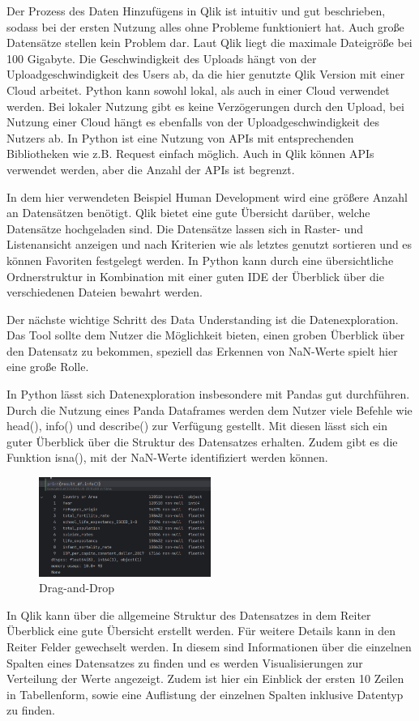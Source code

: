 \documentclass[12pt]{article}
\begin{document}
	Der Prozess des Daten Hinzufügens in Qlik ist intuitiv und gut beschrieben, sodass bei der ersten Nutzung alles ohne Probleme funktioniert hat. Auch große Datensätze stellen kein Problem dar. Laut Qlik liegt die maximale Dateigröße bei 100 Gigabyte. Die Geschwindigkeit des Uploads hängt von der Uploadgeschwindigkeit des Users ab, da die hier genutzte Qlik Version mit einer Cloud arbeitet. Python kann sowohl lokal, als auch in einer Cloud verwendet werden. Bei lokaler Nutzung gibt es keine Verzögerungen durch den Upload, bei Nutzung einer Cloud hängt es ebenfalls von der Uploadgeschwindigkeit des Nutzers ab.
	In Python ist eine Nutzung von APIs mit entsprechenden Bibliotheken wie z.B. Request einfach möglich.
	Auch in Qlik können APIs verwendet werden, aber die Anzahl der APIs ist begrenzt.
	
	In dem hier verwendeten Beispiel Human Development wird eine größere Anzahl an Datensätzen benötigt. Qlik bietet eine gute Übersicht darüber, welche Datensätze hochgeladen sind. Die Datensätze lassen sich in Raster- und Listenansicht anzeigen und nach Kriterien wie als letztes genutzt sortieren und es können Favoriten festgelegt werden. In Python kann durch eine übersichtliche Ordnerstruktur in Kombination mit einer guten IDE der Überblick über die verschiedenen Dateien bewahrt werden.
	
	Der nächste wichtige Schritt des Data Understanding ist die Datenexploration. Das Tool sollte dem Nutzer die Möglichkeit bieten, einen groben Überblick über den Datensatz zu bekommen, speziell das Erkennen von NaN-Werte spielt hier eine große Rolle.
	
	In Python lässt sich Datenexploration insbesondere mit Pandas gut durchführen. Durch die Nutzung eines Panda Dataframes werden dem Nutzer viele Befehle wie head(), info() und describe() zur Verfügung gestellt. Mit diesen lässt sich ein guter Überblick über die Struktur des Datensatzes erhalten. Zudem gibt es die Funktion isna(), mit der NaN-Werte identifiziert werden können.	
	\begin{figure}[h]
		\centering
		\includegraphics[width=0.5\textwidth]{info()}
		\caption{Drag-and-Drop}
	\end{figure}
	In Qlik kann über die allgemeine Struktur des Datensatzes in dem Reiter Überblick eine gute Übersicht erstellt werden. Für weitere Details kann in den Reiter Felder gewechselt werden. In diesem sind Informationen über die einzelnen Spalten eines Datensatzes zu finden und es werden Visualisierungen zur Verteilung der Werte angezeigt. Zudem ist hier ein Einblick der ersten 10 Zeilen in Tabellenform, sowie eine Auflistung der einzelnen Spalten inklusive Datentyp zu finden.
	
\end{document}

